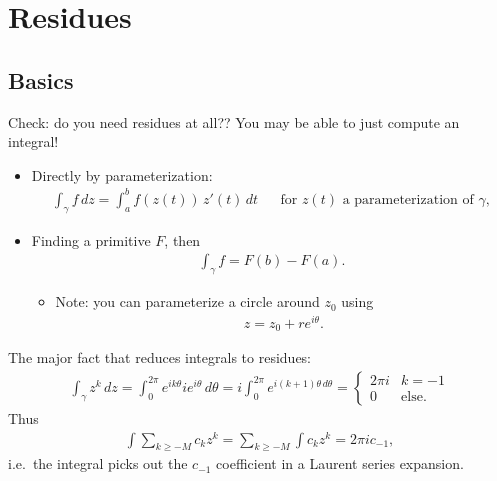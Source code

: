 \hypertarget{residues}{%
\section{Residues}\label{residues}}

\hypertarget{basics}{%
\subsection{Basics}\label{basics}}

\begin{remark}

Check: do you need residues at all?? You may be able to just compute an
integral!

\begin{itemize}
\item
  Directly by parameterization:
  \begin{align*}
  \int_\gamma f \,dz= \int_a^b f(z(t))\, z'(t) \,dt&& \text{for } z(t) \text{ a parameterization of } \gamma
  ,\end{align*}
\item
  Finding a primitive \(F\), then
  \begin{align*}
  \int_\gamma f = F(b) - F(a)
  .\end{align*}

  \begin{itemize}
  \tightlist
  \item
    Note: you can parameterize a circle around \(z_0\) using
    \begin{align*}
    z= z_0 + re^{i \theta }
    .\end{align*}
  \end{itemize}
\end{itemize}

\end{remark}

\begin{fact}

The major fact that reduces integrals to residues:
\begin{align*}
\int_\gamma z^k \,dz= \int_0^{2\pi} e^{ik\theta} ie^{i\theta } \,d\theta= i\int_0^{2\pi} e^{i(k+1)\theta \,d\theta}
=
\begin{cases}
2\pi i & k=-1 
\\
0 & \text{else}.
\end{cases}
\end{align*}
Thus
\begin{align*}
\int \sum_{k\geq -M} c_k z^k = \sum_{k\geq -M} \int c_k z^k = 2\pi i c_{-1}
,\end{align*}
i.e.~the integral picks out the \(c_{-1}\) coefficient in a Laurent
series expansion.

\end{fact}

